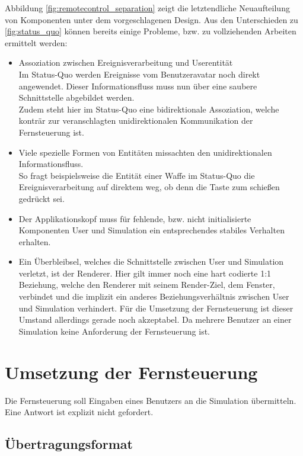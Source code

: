 Abbildung \ref{fig:remotecontrol_separation} zeigt die letztendliche Neuaufteilung von Komponenten unter dem vorgeschlagenen Design. Aus den Unterschieden zu \ref{fig:status_quo} können bereits einige Probleme, bzw. zu vollziehenden Arbeiten ermittelt werden:
\begin{itemize}
	\item Assoziation zwischen Ereignisverarbeitung und Userentität\\
	Im Status-Quo werden Ereignisse vom Benutzeravatar noch direkt angewendet. Dieser Informationsfluss muss nun über eine saubere Schnittstelle abgebildet werden.\\
	Zudem steht hier im Status-Quo eine bidirektionale Assoziation, welche konträr zur veranschlagten unidirektionalen Kommunikation der Fernsteuerung ist.
	\item Viele spezielle Formen von Entitäten missachten den unidirektionalen Informationsfluss.\\
	So fragt beispielsweise die Entität einer Waffe im Status-Quo die Ereignisverarbeitung auf direktem weg, ob denn die Taste zum schießen gedrückt sei.
	\item Der Applikationskopf muss für fehlende, bzw. nicht initialisierte Komponenten User und Simulation ein entsprechendes stabiles Verhalten erhalten.
	\item Ein Überbleibsel, welches die Schnittstelle zwischen User und Simulation verletzt, ist der Renderer. Hier gilt immer noch eine hart codierte 1:1 Beziehung, welche den Renderer mit seinem Render-Ziel, dem Fenster, verbindet und die implizit ein anderes Beziehungsverhältnis zwischen User und Simulation verhindert. Für die Umsetzung der Fernsteuerung ist dieser Umstand allerdings gerade noch akzeptabel. Da mehrere Benutzer an einer Simulation keine Anforderung der Fernsteuerung ist.
\end{itemize}

\section{Umsetzung der Fernsteuerung}
Die Fernsteuerung soll Eingaben eines Benutzers an die Simulation übermitteln. Eine Antwort ist explizit nicht gefordert.

\subsection{Übertragungsformat}


